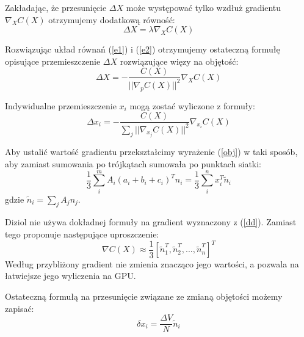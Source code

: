 Zakładając, że przesunięcie $\Delta X$ może występować tylko wzdłuż gradientu $\nabla_X
C(X)$ otrzymujemy dodatkową równość:
\begin{equation}
\label{e2}
\Delta X = \lambda \nabla_X C(X)
\end{equation}

Rozwiązując układ równań (\ref{e1}) i (\ref{e2}) otrzymujemy ostateczną formułę
opisujące przemieszczenie $\Delta X$ rozwiązujące więzy na objętość:
\begin{equation*}
\Delta X = - \frac{C(X)}{||\nabla_p C(X)||^2} \nabla_X C(X)
\end{equation*}

Indywidualne przemieszczenie $x_i$ mogą zostać wyliczone z formuły:
\begin{equation}
\Delta x_i = - \frac{C(X)}{\sum_j ||\nabla_{x_j} C(X)||^2} \nabla_{x_i} C(X)
\end{equation}

Aby ustalić wartość gradientu przekształcimy wyrażenie (\ref{obj}) w taki sposób,
	aby zamiast sumowania po trójkątach sumowała po punktach siatki:
\begin{equation}
\label{dd}
\frac{1}{3} \sum_i^m A_i (a_i + b_i + c_i)^T n_i = \frac{1}{3} \sum_i^n x_i^T
\tilde{n}_i
\end{equation}
gdzie $\tilde{n}_i = \sum_j A_j n_j$.

Diziol \cite{diziol} nie używa dokładnej formuły na gradient wyznaczony z
(\ref{dd}). Zamiast tego proponuje następujące uproszczenie:
\begin{equation}
\nabla C(X) \approx \frac{1}{3} [\tilde{n}^T_1, \tilde{n}^T_2, ...,
	\tilde{n}^T_n]^T
\end{equation}
Według \cite{diziol} przybliżony gradient nie zmienia znacząco jego wartości, a
pozwala na łatwiejsze jego wyliczenia na GPU.

Ostateczną formułą na przesunięcie związane ze zmianą objętości możemy zapisać:
\begin{equation}
\delta x_i = \frac{\Delta V}{N} \tilde{n}_i
\end{equation}



